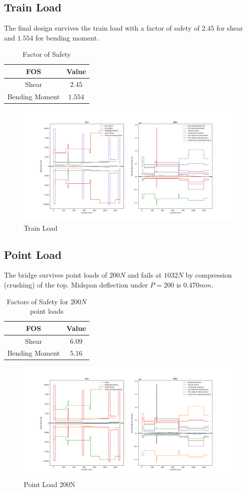 \documentclass[11pt,twocolumn,letterpaper]{article}
\begin{document}
\subsection*{Train Load}
The final design survives the train load with a factor of safety of $2.45$ for shear and $1.554$ for bending moment.

\begin{table}[h]
\begin{center}
\begin{tabular}{|cc|} 
\hline
\multicolumn{1}{|c}{FOS} & \multicolumn{1}{c|}{Value} \\
\hline
Shear &   $2.45$ \\
Bending Moment &   $1.554$ \\
\hline
\end{tabular}
\caption{Factor of Safety}
\end{center}
\end{table}

\begin{figure}[h!]
  \centering
    \includegraphics[width=.4\textwidth]{figures/SBTrainload.png}
    \caption {Train Load}
  \hfill
\end{figure}
\newpage
\subsection*{Point Load}
The bridge survives point loads of $200\si{N}$ and fails at $1032\si{N}$ by compression (crushing) of the top.
Midspan deflection under $P = 200$ is $0.470\si{mm}$.
\begin{table}[h]
\begin{center}
\begin{tabular}{|cc|} 
\hline
\multicolumn{1}{|c}{FOS} & \multicolumn{1}{c|}{Value} \\
\hline
Shear &   $6.09$ \\
Bending Moment &   $5.16$ \\
\hline
\end{tabular}
\caption{Factors of Safety for $200\si{N}$ point loads}
\end{center}
\end{table}

\begin{figure}[ht!]
  \centering
    \includegraphics[width=.4\textwidth]{figures/SBPoint200.png}
    \caption {Point Load 200N}
  \hfill
\end{figure}
\end{document}

